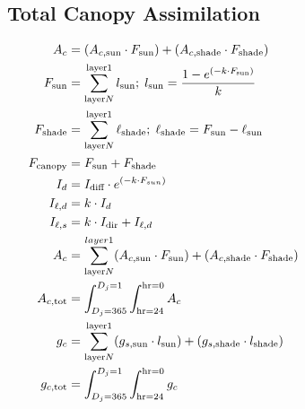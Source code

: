\documentclass[12pt]{report}
\begin{document}
\subsection*{Total Canopy Assimilation}
\begin{align}
 A_c &= (A_{c,\text{sun}}\cdot F_{\text{sun}}) + (A_{c,\text{shade}} \cdot F_{\text{shade}}) \label{eqn:Ac} \\
 F_{\text{sun}} &= \sum_{\text{layer} N}^{\text{layer} 1} l_{\text{sun}} ; \;  l_{\text{sun}} = \frac{1-e^{(-k\cdot F_{\text{sun}})}}{k} \label{eqn:Fsun2} \\
 F_{\text{shade}} &= \sum_{\text{layer} N}^{\text{layer} 1} \ell_{\text{shade}}; \; \ell_{\text{shade}}=F_{\text{sun}}-\ell_{\text{sun}} \label{eqn:Fshade2} \\
 F_{\text{canopy}} &= F_{\text{sun}} + F_{\text{shade}} \hspace{3.1in} \label{eqn:Fcanopy2}\\
 I_{d} &= I_{\text{diff}} \cdot e^{(-k\cdot F_{sun})} \label{eqn:Id} \\
 I_{\ell,d} &= k \cdot I_{d} \label{eqn:Ielld} \\
 I_{\ell,s} &= k \cdot I_{\text{dir}} + I_{\ell,d} \label{eqn:Iells} \\
 A_c &= \sum_{\text{layer} N}^{layer 1} (A_{c,\text{sun}} \cdot F_{\text{sun}}) + (A_{c,\text{shade}} \cdot F_{\text{shade}}) \label{eqn:Ac2} \\
 A_{c,\text{tot}} &= \int_{D_j = 365}^{D_j = 1}\int_{\text{hr}=24}^{\text{hr}=0} A_c \label{eqn:Actot} \\
 g_c &= \sum_{\text{layer} N}^{\text{layer} 1}(g_{s,\text{sun}}\cdot l_{\text{sun}}) + (g_{s,\text{shade}}\cdot l_{\text{shade}}) \label{eqn:gc}\\ 
 g_{c,\text{tot}} &= \int_{D_j=365}^{D_j=1}\int_{\text{hr}=24}^{\text{hr}=0}g_c \label{eqn:gctot} \\
\end{align}
\end{document}

